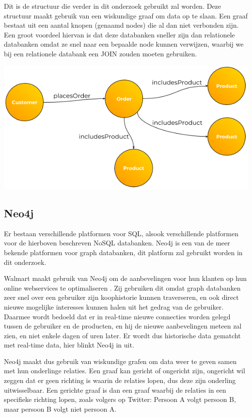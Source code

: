 Dit is de structuur die verder in dit onderzoek gebruikt zal worden. Deze structuur maakt gebruik van een wiskundige graaf om data op te slaan. Een graaf bestaat uit een aantal knopen (genaamd nodes) die al dan niet verbonden zijn. Een groot voordeel hiervan is dat deze databanken sneller zijn dan relationele databanken omdat ze snel naar een bepaalde node kunnen verwijzen, waarbij we bij een relationele databank een JOIN zouden moeten gebruiken. 

	\includegraphics[width=\linewidth]{img/Customer-Order-Example-Graph.png}
	
\subsection{Neo4j}
\label{sec:Neo4j}

Er bestaan verschillende platformen voor SQL, alsook verschillende platformen voor de hierboven beschreven NoSQL databanken. Neo4j is een van de meer bekende platformen voor graph databanken, dit platform zal gebruikt worden in dit onderzoek.

Walmart maakt gebruik van Neo4j om de aanbevelingen voor hun klanten op hun online webservices te optimaliseren \autocite{neo4jWalmart2014}. Zij gebruiken dit omdat graph databanken zeer snel over een gebruiker zijn koophistorie kunnen traverseren, en ook direct nieuwe mogelijke interesses kunnen halen uit het gedrag van de gebruiker. Daarmee wordt bedoeld dat er in real-time nieuwe connecties worden gelegd tussen de gebruiker en de producten, en hij de nieuwe aanbevelingen meteen zal zien, en niet enkele dagen of uren later. Er wordt dus historische data gematcht met real-time data, hier blinkt Neo4j in uit. 

Neo4j maakt dus gebruik van wiskundige grafen om data weer te geven samen met hun onderlinge relaties. Een graaf kan gericht of ongericht zijn, ongericht wil zeggen dat er geen richting is waarin de relaties lopen, dus deze zijn onderling uitwisselbaar. Een gerichte graaf is dan een graaf waarbij de relaties in een specifieke richting lopen, zoals volgers op Twitter: Persoon A volgt persoon B, maar persoon B volgt niet persoon A.

